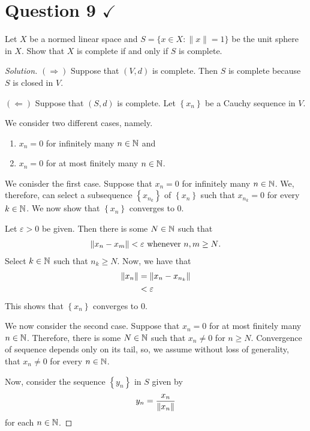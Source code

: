 \section{Question 9 \texorpdfstring{$\checkmark$}{}}
\horz
Let $X$ be a normed linear space and $S=\{x\in X: \|x\|=1\}$ be the unit sphere in $X$. Show that $X$ is complete if and only if $S$ is complete. 
\horz
\begin{proof}[Solution]
    $\left( \Rightarrow \right)$ Suppose that $\left( V,d \right)$ is complete. Then $S$ is complete because $S$ is closed in $V$. 

    $\left( \Leftarrow \right)$ Suppose that $\left( S,d \right)$ is complete. Let $\left\{ x_{n} \right\}$ be a Cauchy sequence in $V$.

    We consider two different cases, namely.
    \begin{enumerate}[label=(\roman*)]
	\item $x_{n} = 0$ for infinitely many $n\in \mathbb N$ and
	\item $x_{n} = 0$ for at most finitely many $n\in \mathbb N$.
    \end{enumerate}

    We conisder the first case. Suppose that $x_{n} = 0$ for infinitely many $n\in \mathbb N$. We, therefore, can select a subsequence $\left\{ x_{n_k} \right\}$ of $\left\{ x_{n} \right\}$ such that $x_{n_{k}} = 0$ for every $k\in \mathbb N$. We now show that $\left\{ x_{n} \right\}$ converges to $0$.

    Let $\varepsilon > 0$ be given. Then there is some $N \in \mathbb N$ such that
    \begin{align*}
	\left\lVert x_{n} - x_{m} \right\rVert < \varepsilon \text{ whenever } n,m \ge N\text{.}
    \end{align*}
    Select $k\in \mathbb N$ such that $n_{k} \ge N$. Now, we have that
    \begin{align*}
	\left\lVert x_{n} \right\rVert &= \left\lVert x_{n} - x_{n_k} \right\rVert \\
	&< \varepsilon
    \end{align*}
    This shows that $\left\{ x_{n} \right\}$ converges to $0$.

    We now consider the second case. Suppose that $x_{n} = 0$ for at most finitely many $n\in \mathbb N$. Therefore, there is some $N\in \mathbb N$ such that $x_{n} \ne 0$ for $n\ge N$. Convergence of sequence depends only on its tail, so, we assume without loss of generality, that $x_{n} \ne 0$ for every $n\in \mathbb N$.
    
    Now, consider the sequence $\left\{ y_{n} \right\} $ in $S$ given by
    \begin{equation*}
	y_{n} = \frac{x_{n}}{\left\lVert x_{n} \right\rVert}
    \end{equation*}
    for each $n\in \mathbb N$.


\end{proof}
